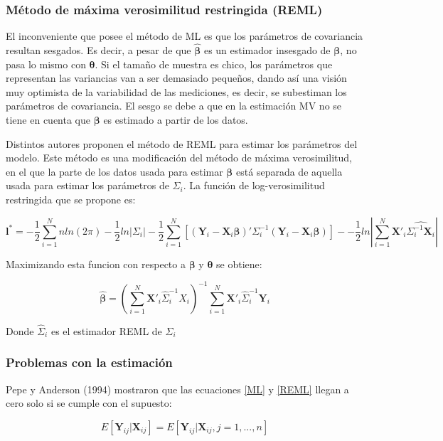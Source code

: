 \documentclass[spanish]{article}
\numberwithin{figure}{subsection}
\numberwithin{equation}{subsection}
\numberwithin{table}{subsection}
\begin{document}
\subsubsection{Método de máxima verosimilitud restringida (REML)}

El inconveniente que posee el método de ML es que los parámetros de covariancia
resultan sesgados. Es decir, a pesar de que $\bm{\hat{\beta}}$ es un estimador
insesgado de $\bm{\beta}$, no pasa lo mismo con $\bm{\theta}$. Si el tamaño de
muestra es chico, los parámetros que representan las variancias van a ser
demasiado pequeños, dando así una visión muy optimista de la variabilidad de las
mediciones, es decir, se subestiman los parámetros de covariancia. El sesgo se
debe a que en la estimación MV no se tiene en cuenta que $\bm{\beta}$ es
estimado a partir de los datos.

Distintos autores proponen el método de REML para estimar los parámetros del
modelo. Este método es una modificación del método de máxima verosimilitud, en
el que la parte de los datos usada para estimar $\bm{\beta}$ está separada de
aquella usada para estimar los parámetros de $\bm{\varSigma}_i$. La función de
log-verosimilitud restringida que se propone es:

\begin{equation}
\label{REML}
	\bm{l}^* = -\frac{1}{2} \sum_{i=1}^{N}n ln(2\pi) - \frac{1}{2}ln|\bm{\varSigma}_i| -
	\frac{1}{2} \sum_{i=1}^{N} [(\bm{Y}_i - \bm{X}_i\bm{\beta})'
	\bm{\varSigma}_i^{-1} (\bm{Y}_i - \bm{X}_i\bm{\beta})] -
	- \frac{1}{2} ln |\sum_{i=1}^{N} \bm{X}'_i \hat{\bm{\varSigma}_i^{-1} \bm{X}_i}|
\end{equation}

Maximizando esta funcion con respecto a $\bm{\beta}$ y $\bm{\theta}$ se obtiene:

\[ \hat{\bm{\beta}} = (\sum_{i=1}^{N} \bm{X}'_i \hat{\bm{\varSigma}}_i^{-1} X_i)^{-1}
\sum_{i=1}^{N} \bm{X}'_i \hat{\bm{\varSigma}}_i^{-1} \bm{Y}_i\]

Donde $\hat{\bm{\varSigma}}_i$ es el estimador REML de ${\bm{\varSigma}_i}$

\subsubsection{Problemas con la estimación}

Pepe y Anderson (1994) mostraron que las ecuaciones \ref{ML} y \ref{REML} llegan a cero
solo si se cumple con el supuesto:

\begin{equation}
\label{estimation_issue}
	E[\bm{Y}_{ij} | \bm{X}_{ij}] = E[\bm{Y}_{ij} | \bm{X}_{ij}, j = 1, ..., n]
\end{equation}
\end{document}
